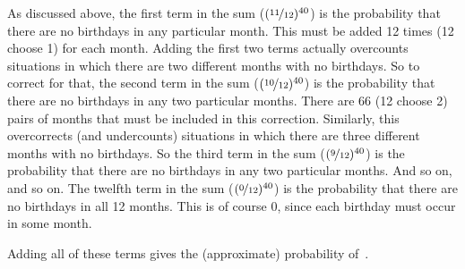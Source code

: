 \documentclass{article}
\begin{document}
As discussed above, the first term in the sum ($(\nicefrac{11}{12})^{40}$) is the probability that there are no birthdays in any particular month.
This must be added 12 times (12 choose 1) for each month.
Adding the first two terms actually overcounts situations in which there are two different months with no birthdays.
So to correct for that, the second term in the sum ($(\nicefrac{10}{12})^{40}$) is the probability that there are no birthdays in any two particular months.
There are 66 (12 choose 2) pairs of months that must be included in this correction.
Similarly, this overcorrects (and undercounts) situations in which there are three different months with no birthdays.
So the third term in the sum ($(\nicefrac{9}{12})^{40}$) is the probability that there are no birthdays in any two particular months.
And so on, and so on.
The twelfth term in the sum ($(\nicefrac{0}{12})^{40}$) is the probability that there are no birthdays in all 12 months.
This is of course 0, since each birthday must occur in some month.

Adding all of these terms gives the (approximate) probability of \,.
\end{document}

